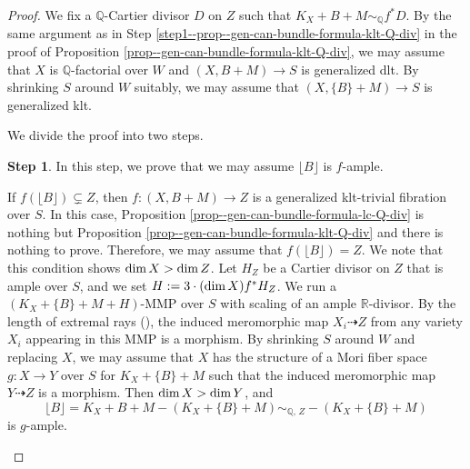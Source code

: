 \documentclass[12pt]{amsart}
\theoremstyle{definition}
\newtheorem{step2}{Step}
\begin{document}
\begin{proof}
We fix a $\mathbb{Q}$-Cartier divisor $D$ on $Z$ such that $K_{X}+B+M \sim_{\mathbb{Q}}f^{*}D$. 
By the same argument as in Step \ref{step1--prop--gen-can-bundle-formula-klt-Q-div} in the proof of Proposition \ref{prop--gen-can-bundle-formula-klt-Q-div}, we may assume that $X$ is $\mathbb{Q}$-factorial over $W$ and $(X,B+M) \to S$ is generalized dlt. 
By shrinking $S$ around $W$ suitably, we may assume that $(X, \{B\}+M) \to S$ is generalized klt. 

We divide the proof into two steps. 

\begin{step2}\label{step2--prop-gen-can-bundle-formula-lc-Q-div}
In this step, we prove that we may assume $\lfloor B \rfloor$ is $f$-ample. 

If $f(\lfloor B \rfloor)\subsetneq Z$, then $f \colon (X,B+M) \to Z$ is a generalized klt-trivial fibration over $S$. 
In this case, Proposition \ref{prop--gen-can-bundle-formula-lc-Q-div} is nothing but Proposition \ref{prop--gen-can-bundle-formula-klt-Q-div} and there is nothing to prove. 
Therefore, we may assume that $f(\lfloor B \rfloor)=Z$. 
We note that this condition shows ${\rm dim}\,X > {\rm dim}\,Z$. 
Let $H_{Z}$ be a Cartier divisor on $Z$ that is ample over $S$, and we set $H:=3 \cdot ({\rm dim}\,X) f^{*}H_{Z}$. 
We run a $(K_{X}+\{B\}+M+H)$-MMP over $S$ with scaling of an ample $\mathbb{R}$-divisor. 
By the length of extremal rays (\cite[Theorem 1.1.6 (5)]{fujino-analytic-conethm}), the induced meromorphic map $X_{i} \dashrightarrow Z$ from any variety $X_{i}$ appearing in this MMP is a morphism. 
By shrinking $S$ around $W$ and replacing $X$, we may assume that $X$ has the structure of a Mori fiber space $g \colon X \to Y$ over $S$ for $K_{X}+\{B\}+M$ such that the induced meromorphic map $Y \dashrightarrow Z$ is a morphism. 
Then ${\rm dim}\,X>{\rm dim}\,Y$, and
$$\lfloor B \rfloor = K_{X}+B+M-(K_{X}+\{B\}+M)\sim_{\mathbb{Q},\,Z} -(K_{X}+\{B\}+M)$$ 
is $g$-ample. 


\end{step2}
\end{proof}
\end{document}
